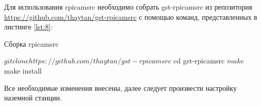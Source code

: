 Для использования rpicamsrc необходимо собрать gst-rpicamsrc из репозитория \url{https://github.com/thaytan/gst-rpicamsrc} с помощью команд, представленных в листинге \ref{lst:8}:
\begin{Program}[H]
\caption{Сборка rpicamsrc} \label{lst:8}
\begin{MyCode}
$ git clone https://github.com/thaytan/gst-rpicamsrc
$ cd gst-rpicamsrc
$ make
$ make install
\end{MyCode}
\end{Program}

Все необходимые изменения внесены, далее следует произвести настройку наземной станции.

